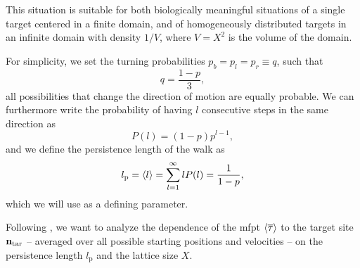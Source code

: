 This situation is suitable for both biologically meaningful situations of a single target centered in a finite domain, and of homogeneously distributed targets in an infinite domain with density $1/V$, where \mbox{$V = X^2$} is the volume of the domain.

For simplicity, we set the turning probabilities $p_b = p_l = p_r \equiv q$, such that
\begin{equation*}
 q = \frac{1-p}{3},
\end{equation*}
\ie all possibilities that change the direction of motion are equally probable. We can furthermore write the probability of having $l$ consecutive steps in the same direction as
\begin{equation*}
 P(l) = (1-p) p^{l-1},
\end{equation*}
and we define the persistence length of the walk as
\begin{equation*}
 l_\textrm{p} = \avg{l} = \sum\limits_{l=1}^\infty l P(l) = \frac{1}{1-p},
\end{equation*}
which we will use as a defining parameter.

Following \cite{tejedor:2012}, we want to analyze the dependence of the \ac{mfpt} $\mfpt[\mean{\tau}]$ to the target site $\bv{n}_\textrm{tar}$ -- averaged over all possible starting positions and velocities -- on the persistence length $l_\textrm{p}$ and the lattice size $X$.


